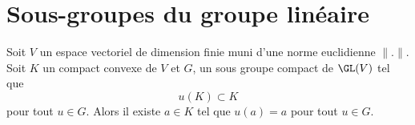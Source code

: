 
\section{Sous-groupes du groupe linéaire}

\begin{lemma}       \label{LemOCtdiaE}
    Soit \( V\) un espace vectoriel de dimension finie muni d'une norme euclidienne \( \| . \|\). Soit \( K\) un compact convexe de \( V\) et \( G\), un sous groupe compact de \( \GL(V)\) tel que
    \begin{equation}
        u(K)\subset K
    \end{equation}
    pour tout \( u\in G\). Alors il existe \( a\in K\) tel que \( u(a)=a\) pour tout \( u\in G\).
\end{lemma}


